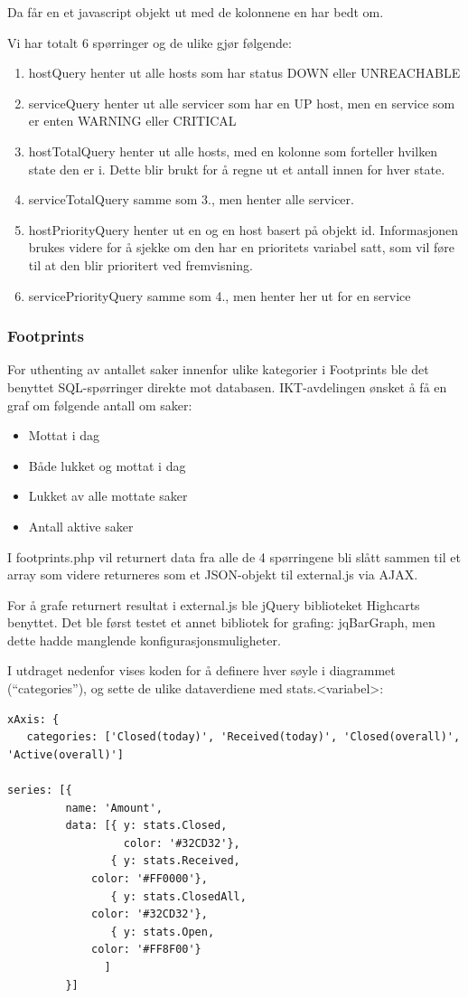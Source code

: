 Da får en et javascript objekt ut med de kolonnene en har bedt om.

Vi har totalt 6 spørringer og de ulike gjør følgende:
\begin{enumerate}
	\item  hostQuery henter ut alle hosts som har status DOWN eller UNREACHABLE
	\item  serviceQuery henter ut alle servicer som har en UP host, men en service som er enten WARNING eller CRITICAL
	\item  hostTotalQuery henter ut alle hosts, med en kolonne som forteller hvilken state den er i. Dette blir brukt for å regne ut et antall innen for hver state.
	\item  serviceTotalQuery samme som 3., men henter alle servicer.
	\item  hostPriorityQuery henter ut en og en host basert på objekt id. Informasjonen brukes videre for å sjekke om den har en prioritets variabel satt, som vil føre til at den blir prioritert ved fremvisning.
	\item  servicePriorityQuery samme som 4., men henter her ut for en service
\end{enumerate}

\subsubsection{Footprints}

For uthenting av antallet saker innenfor ulike kategorier i Footprints ble det benyttet SQL-spørringer direkte mot databasen. IKT-avdelingen ønsket å få en graf om følgende antall om saker:
\begin{itemize}
	\item Mottat i dag
	\item Både lukket og mottat i dag
	\item Lukket av alle mottate saker
	\item Antall aktive saker
\end{itemize}

I footprints.php vil returnert data fra alle de 4 spørringene bli slått sammen til et array som videre returneres som et JSON-objekt til external.js via AJAX. 

For å grafe returnert resultat i external.js ble jQuery biblioteket Highcarts benyttet. Det ble først testet et annet bibliotek for grafing: jqBarGraph, men dette hadde manglende konfigurasjonsmuligheter.  

I utdraget nedenfor vises koden for å definere hver søyle i diagrammet (“categories”), og sette de ulike dataverdiene med stats.<variabel>:
\begin{lstlisting}
xAxis: {
   categories: ['Closed(today)', 'Received(today)', 'Closed(overall)', 'Active(overall)']

series: [{
         name: 'Amount',
         data: [{ y: stats.Closed,
                  color: '#32CD32'},
                { y: stats.Received,
             color: '#FF0000'},
                { y: stats.ClosedAll,
             color: '#32CD32'},
                { y: stats.Open,
             color: '#FF8F00'}
               ]
         }]
\end{lstlisting}

